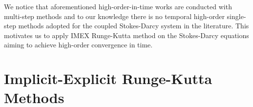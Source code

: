 \documentclass[a4paper, oneside]{book}
\def\rmd{{\mathrm{d}}}
\begin{document}
We notice that aforementioned high-order-in-time works are conducted with multi-step methods and to our knowledge there is no temporal high-order single-step methods adopted for the coupled Stokes-Darcy system in the literature. This motivates us to apply IMEX Runge-Kutta method on the Stokes-Darcy equations aiming to achieve high-order convergence in time.









\section{Implicit-Explicit Runge-Kutta Methods}\label{sec:IMEX}




\end{document}
